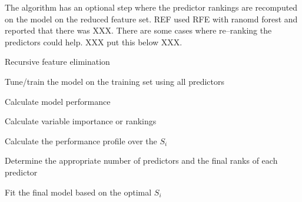 \documentclass[12pt]{article}
\begin{document}
The algorithm has an optional step where the predictor rankings are recomputed on the model on the reduced feature set. REF used RFE with ranomd forest and reported that there was XXX. There are some cases where re--ranking the predictors could help. XXX put this below XXX.

\begin{algorithm}[H]
   \caption{Recursive feature elimination}
   \label{A:rfe}
   \SetLine
   \dontprintsemicolon


    \vspace*{3pt} Tune/train the model on the training set using all predictors\vspace*{3pt}\; 

    \vspace*{3pt} Calculate model performance\vspace*{3pt}\; 

     \vspace*{3pt} Calculate variable importance or rankings\vspace*{3pt} \; 


    \vspace*{3pt} Calculate the performance profile over the $S_i$ \vspace*{3pt}\;
    
    \vspace*{3pt} Determine the appropriate number of predictors and the final ranks of each predictor\vspace*{3pt}\;

    \vspace*{3pt} Fit the final model based on the optimal $S_i$ \vspace*{3pt}\;    
    
\end{algorithm}
\end{document}
